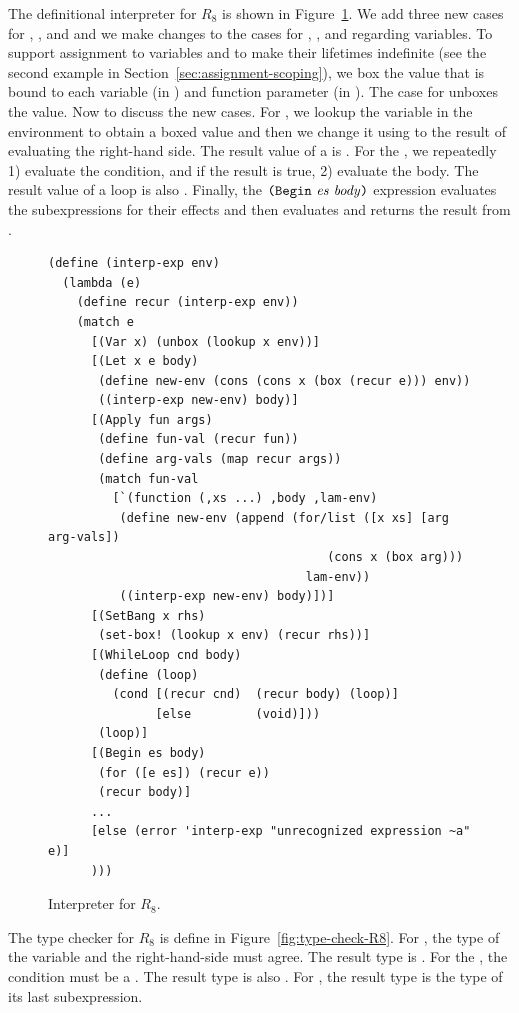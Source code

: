 \documentclass[11pt]{book}
\begin{document}
The definitional interpreter for $R_8$ is shown in
Figure~\ref{fig:interp-R8}. We add three new cases for ,
, and  and we make changes to the cases
for , , and  regarding variables. To
support assignment to variables and to make their lifetimes indefinite
(see the second example in Section~\ref{sec:assignment-scoping}), we
box the value that is bound to each variable (in ) and
function parameter (in ). The case for  unboxes
the value.
%
Now to discuss the new cases. For , we lookup the
variable in the environment to obtain a boxed value and then we change
it using  to the result of evaluating the right-hand
side.  The result value of a  is .
%
For the , we repeatedly 1) evaluate the condition, and
if the result is true, 2) evaluate the body.
The result value of a  loop is also .
%
Finally, the $\texttt{(}\texttt{Begin}~\mathit{es}~\mathit{body}\texttt{)}$ expression evaluates the
subexpressions  for their effects and then evaluates
and returns the result from .


\begin{figure}[tbp]
\begin{lstlisting}[basicstyle=\ttfamily\footnotesize]
(define (interp-exp env)
  (lambda (e)
    (define recur (interp-exp env))
    (match e
      [(Var x) (unbox (lookup x env))]
      [(Let x e body)
       (define new-env (cons (cons x (box (recur e))) env))
       ((interp-exp new-env) body)]
      [(Apply fun args)
       (define fun-val (recur fun))
       (define arg-vals (map recur args))
       (match fun-val
         [`(function (,xs ...) ,body ,lam-env)
          (define new-env (append (for/list ([x xs] [arg arg-vals])
                                       (cons x (box arg)))
                                    lam-env))
          ((interp-exp new-env) body)])]
      [(SetBang x rhs)
       (set-box! (lookup x env) (recur rhs))]
      [(WhileLoop cnd body)
       (define (loop)
         (cond [(recur cnd)  (recur body) (loop)]
               [else         (void)]))
       (loop)]
      [(Begin es body)
       (for ([e es]) (recur e))
       (recur body)]
      ...
      [else (error 'interp-exp "unrecognized expression ~a" e)]
      )))
\end{lstlisting}
\caption{Interpreter for $R_8$.}
\label{fig:interp-R8}
\end{figure}

The type checker for $R_8$ is define in
Figure~\ref{fig:type-check-R8}.  For , the type of the
variable and the right-hand-side must agree. The result type is
. For the , the condition must be a
. The result type is also .  For
, the result type is the type of its last subexpression.
\end{document}
